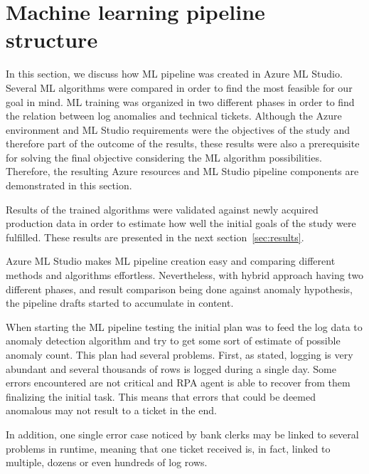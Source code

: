 

\section{Machine learning pipeline structure}\label{sec:ml-pipeline}

In this section,
we discuss how ML pipeline was created in Azure ML Studio.
Several ML algorithms were compared
in order to find the most feasible for our goal in mind.
ML training was organized in two different phases
in order to find the relation between
log anomalies and technical tickets.
Although the Azure environment and ML Studio requirements
were the objectives of the study and therefore part of the outcome of the results,
these results were also a prerequisite for solving the final objective
considering the ML algorithm possibilities.
Therefore,
the resulting Azure resources and ML Studio pipeline components
are demonstrated in this section.

Results of the trained algorithms
were validated against newly acquired production data
in order to estimate how well the initial goals of the study
were fulfilled.
These results are presented in the next section~\ref{sec:results}.

Azure ML Studio makes ML pipeline creation easy
and comparing different methods and algorithms effortless.
Nevertheless,
with hybrid approach having two different phases,
and result comparison being done against anomaly hypothesis,
the pipeline drafts started to accumulate in content.

When starting the ML pipeline testing
the initial plan was to feed the log data to anomaly detection algorithm
and try to get some sort of estimate of possible anomaly count.
This plan had several problems.
First, as stated, logging is very abundant
and several thousands of rows is logged
during a single day.
Some errors encountered are not critical
and RPA agent is able to recover from them
finalizing the initial task.
This means that errors that could be deemed anomalous
may not result to a ticket in the end.

In addition,
one single error case noticed by bank clerks
may be linked to several problems in runtime,
meaning that one ticket received is,
in fact, linked to multiple, dozens or
even hundreds of log rows.

